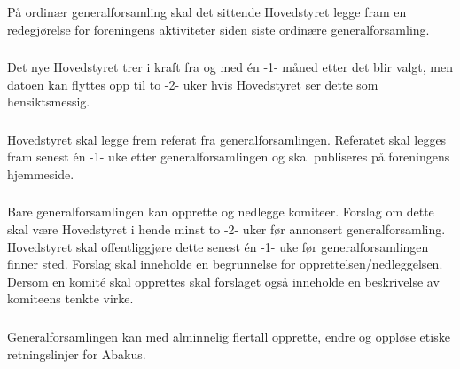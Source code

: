 \subsubsection{}
På ordinær generalforsamling skal det sittende Hovedstyret legge fram en
redegjørelse for foreningens aktiviteter siden siste ordinære
generalforsamling.

\subsubsection{}
Det nye Hovedstyret trer i kraft fra og med én -1- måned etter det blir valgt,
men datoen kan flyttes opp til to -2- uker hvis Hovedstyret ser dette som hensiktsmessig.

\subsubsection{}
Hovedstyret skal legge frem referat fra generalforsamlingen. Referatet skal
legges fram senest én -1- uke etter generalforsamlingen og skal publiseres på
foreningens hjemmeside.

\subsubsection{}
Bare generalforsamlingen kan opprette og nedlegge komiteer. Forslag om dette
skal være Hovedstyret i hende minst to -2- uker før annonsert
generalforsamling. Hovedstyret skal offentliggjøre dette senest én -1- uke før
generalforsamlingen finner sted. Forslag skal inneholde en begrunnelse for
opprettelsen/nedleggelsen. Dersom en komité skal opprettes skal forslaget også
inneholde en beskrivelse av komiteens tenkte virke.

\subsubsection{}
Generalforsamlingen kan med alminnelig flertall opprette, endre og oppløse etiske retningslinjer for
Abakus.
